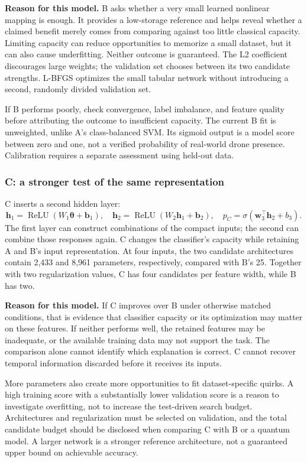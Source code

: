 \documentclass[11pt,letterpaper]{article}
\begin{document}
\textbf{Reason for this model.} B asks whether a very small learned nonlinear
mapping is enough. It provides a low-storage reference and helps reveal whether
a claimed benefit merely comes from comparing against too little classical
capacity. Limiting capacity can reduce opportunities to memorize a small
dataset, but it can also cause underfitting. Neither outcome is guaranteed.
The L2 coefficient discourages large weights; the validation set chooses
between its two candidate strengths. L-BFGS optimizes the small tabular network
without introducing a second, randomly divided validation set.

If B performs poorly, check convergence, label imbalance, and feature quality
before attributing the outcome to insufficient capacity. The current B fit is
unweighted, unlike A's class-balanced SVM. Its sigmoid output is a model score
between zero and one, not a verified probability of real-world drone presence.
Calibration requires a separate assessment using held-out data.

\subsubsection{C: a stronger test of the same representation}
C inserts a second hidden layer:
\begin{equation}
 \mathbf{h}_1=\operatorname{ReLU}(W_1\boldsymbol{\theta}+\mathbf{b}_1),\quad
 \mathbf{h}_2=\operatorname{ReLU}(W_2\mathbf{h}_1+\mathbf{b}_2),\quad
 p_C=\sigma(\mathbf{w}_3^\top\mathbf{h}_2+b_3).
\end{equation}
The first layer can construct combinations of the compact inputs; the second
can combine those responses again. C changes the classifier's capacity while
retaining A and B's input representation. At four inputs, the two candidate
architectures contain 2,433 and 8,961 parameters, respectively, compared with
B's 25. Together with two regularization values, C has four candidates per
feature width, while B has two.

\textbf{Reason for this model.} If C improves over B under otherwise matched
conditions, that is evidence that classifier capacity or its optimization may
matter on these features. If neither performs well, the retained features may
be inadequate, or the available training data may not support the task. The
comparison alone cannot identify which explanation is correct. C cannot
recover temporal information discarded before it receives its inputs.

More parameters also create more opportunities to fit dataset-specific quirks.
A high training score with a substantially lower validation score is a reason
to investigate overfitting, not to increase the test-driven search budget.
Architectures and regularization must be selected on validation, and the total
candidate budget should be disclosed when comparing C with B or a quantum
model. A larger network is a stronger reference architecture, not a guaranteed
upper bound on achievable accuracy.
\end{document}
